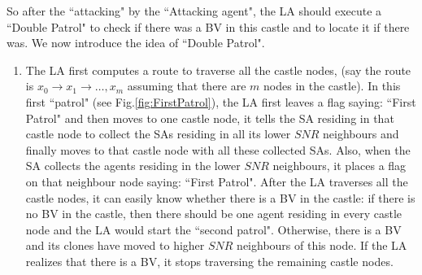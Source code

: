 So after the ``attacking" by the ``Attacking agent", the LA should execute a ``Double Patrol"   to check if there was a BV in this castle and to  locate it if there was.  We  now introduce the idea of   ``Double Patrol".
\begin{enumerate}
\item 
The LA first computes a route to traverse all the castle nodes, (say the route is $x_0\rightarrow x_1 \rightarrow\ldots, x_m$ assuming that there are $m$ nodes in the castle). In this first ``patrol" (see Fig.\ref{fig:FirstPatrol}), the LA first leaves a flag saying: ``First Patrol" and then moves to one castle node, it tells the SA residing in that castle node to collect the SAs residing in all its lower $SNR$ neighbours and finally moves to that castle node with all these collected SAs. Also, when the SA collects the agents  residing in the lower $SNR$ neighbours, it places a flag on that neighbour node saying: ``First Patrol". After the LA traverses all the castle nodes, it can easily know whether there is a BV in the castle: if there is no BV in the castle, then there should be one agent residing in every castle node and the LA would start the ``second patrol". Otherwise, there is a BV and its clones  have moved   to higher $SNR$ neighbours of this node. If the LA realizes that there is a BV, it stops traversing the remaining castle nodes.\\ 


\end{enumerate}
